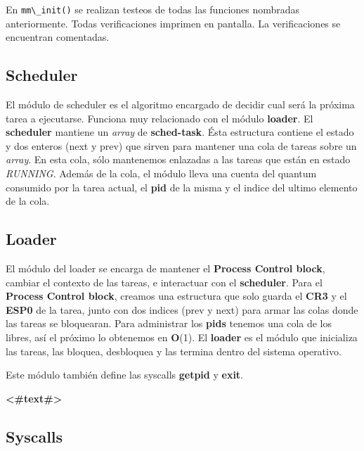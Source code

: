 \documentclass[a4paper]{article}
\newcommand{\func}[1]{\lstinline{#1}}
\begin{document}
En \func{mm\_init()} se realizan testeos de todas las funciones nombradas anteriormente. Todas verificaciones imprimen en pantalla. La verificaciones se encuentran comentadas. 

\subsection{Scheduler}
El módulo de scheduler es el algoritmo encargado de decidir cual será la próxima tarea a ejecutarse. Funciona muy relacionado con el módulo \textbf{loader}. El \textbf{scheduler} mantiene un \textit{array} de \textbf{sched-task}. Ésta estructura contiene el estado y dos enteros (next y prev) que sirven para mantener una cola de tareas sobre un \textit{array}.
En esta cola, sólo mantenemos enlazadas a las tareas que están en estado \textit{RUNNING}.
Además de la cola, el módulo lleva una cuenta del quantum consumido por la tarea actual, el \textbf{pid} de la misma y el indice del ultimo elemento de la cola.

\subsection{Loader}
El módulo del loader se encarga de mantener el \textbf{Process Control block}, cambiar el contexto de las tareas, e interactuar con el \textbf{scheduler}.
Para el \textbf{Process Control block}, creamos una estructura que solo guarda el \textbf{CR3} y el \textbf{ESP0} de la tarea, junto con dos indices (prev y next) para armar las colas donde las tareas se bloquearan.
Para administrar los \textbf{pids} tenemos una cola de los libres, así el próximo lo obtenemos en \textbf{O}(1).
El \textbf{loader} es el módulo que inicializa las tareas, las bloquea, desbloquea y las termina dentro del sistema operativo.

Este módulo también define las syscalls \textbf{getpid} y \textbf{exit}.

\textbf{<#text#>}

\subsection{Syscalls}
\end{document}
